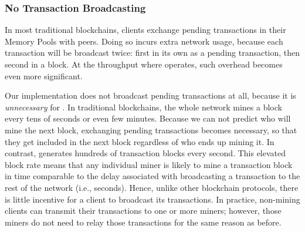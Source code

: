 \subsubsection{No Transaction Broadcasting}

In most traditional blockchains, clients exchange pending transactions in their Memory Pools with peers. Doing so incurs extra network usage, because each transaction will be broadcast twice: first in its own as a pending transaction, then second in a block. At the throughput where \prism operates, such overhead becomes even more significant.

Our implementation does not broadcast pending transactions at all, because it is \textit{unnecessary} for \prism. In traditional blockchains, the whole network mines a block every tens of seconds or even few minutes. Because we can not predict who will mine the next block, exchanging pending transactions becomes necessary, so that they get included in the next block regardless of who ends up mining it. In contrast, \prism generates hundreds of transaction blocks every second. This elevated block rate means that any individual miner is likely to mine a transaction block in time comparable to the delay associated with broadcasting a transaction to the rest of the network (i.e., seconds). Hence, unlike other blockchain protocols, there is little incentive for a \prism client to broadcast its transactions. In practice, non-mining clients can transmit their transactions to one or more miners; however, those miners do not need to relay those transactions for the same reason as before.


\fi
